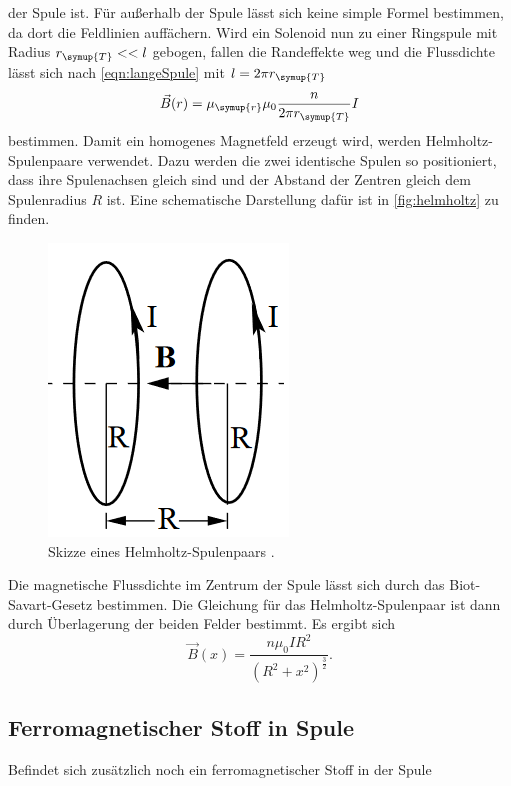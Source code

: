 der Spule ist. Für außerhalb der Spule lässt sich keine simple Formel bestimmen, da dort die Feldlinien
auffächern. Wird ein Solenoid nun zu einer Ringspule mit Radius $r_{\symup{T}} << l$ gebogen, fallen die
Randeffekte weg und die Flussdichte lässt sich nach \autoref{eqn:langeSpule} mit $l = 2\pi r_{\symup{T}}$
\begin{equation}
    \label{eqn:ringspule}
    \vec{B}(r) = \mu_{\symup{r}}\mu_0 \frac{n}{2\pi r_{\symup{T}}} I
\end{equation}
bestimmen. Damit ein homogenes Magnetfeld erzeugt wird, werden Helmholtz-Spulenpaare verwendet. Dazu werden
die zwei identische Spulen so positioniert, dass ihre Spulenachsen gleich sind und der Abstand der Zentren
gleich dem Spulenradius $R$ ist. Eine schematische Darstellung dafür ist in \autoref{fig:helmholtz} zu finden.
\begin{figure}
    \centering
    \includegraphics[scale=0.5]{helmholtzspulenpaar.png}
    \caption{Skizze eines Helmholtz-Spulenpaars \cite{sample}.}
    \label{fig:helmholtz}
\end{figure}
Die magnetische Flussdichte im Zentrum der Spule lässt sich durch das Biot-Savart-Gesetz bestimmen.
Die Gleichung für das Helmholtz-Spulenpaar ist dann durch Überlagerung der beiden Felder bestimmt.
Es ergibt sich
\begin{equation}
    \label{eqn:helmholtz}
    \vec{B}(x) = \frac{n\mu_0 I R^2}{(R^2+x^2)^{\frac{3}{2}}}.
\end{equation}

\subsection{Ferromagnetischer Stoff in Spule}
\label{sec:ferromag}
Befindet sich zusätzlich noch ein ferromagnetischer Stoff in der Spule